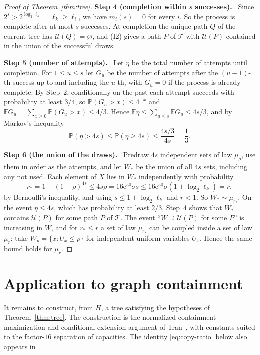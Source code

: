 \documentclass[11pt]{article}
\numberwithin{equation}{section}
\theoremstyle{remark}
\newcommand{\PP}{\mathbb P}
\newcommand{\EE}{\mathbb E}
\newcommand{\TT}{\mathcal T}
\newcommand{\UU}{\mathcal U}
\newcommand{\ee}{\mathrm e}
\newcommand{\step}[1]{\par\medskip\noindent\textbf{#1}\ }
\begin{document}
\begin{proof}[Proof of Theorem~\ref{thm:tree}]
\step{Step 4 (completion within $s$ successes).} Since
$2^s>2^{\log_2\ell_k}=\ell_k\ge\ell_i$, we have $m_i(s)=0$ for every
$i$. So the process is complete after at most $s$ successes. At
completion the unique path $Q$ of the current tree has
$\UU(Q)=\varnothing$, and (I2) gives a path $P$ of $\TT$ with $\UU(P)$
contained in the union of the successful draws.

\step{Step 5 (number of attempts).} Let $\eta$ be the total number of
attempts until completion. For $1\le u\le s$ let $G_u$ be the number of
attempts after the $(u-1)$-th success up to and including the $u$-th,
with $G_u=0$ if the process is already complete. By Step~2,
conditionally on the past each attempt succeeds with probability at
least $3/4$, so $\PP(G_u>x)\le4^{-x}$ and
$\EE G_u=\sum_{x\ge0}\PP(G_u>x)\le4/3$. Hence
$\EE\eta\le\sum_{u\le s}\EE G_u\le4s/3$, and by Markov's inequality
\[
 \PP(\eta>4s)\le\PP(\eta\ge4s)\le\frac{4s/3}{4s}=\frac13 .
\]

\step{Step 6 (the union of the draws).} Predraw $4s$ independent sets
of law $\mu_\rho$, use them in order as the attempts, and let $W_*$ be
the union of all $4s$ sets, including any not used. Each element of $X$
lies in $W_*$ independently with probability
\[
 r_*=1-(1-\rho)^{4s}
 \le4s\rho
 =16\ee^{50}\sigma s
 \le16\ee^{50}\sigma(1+\log_2\ell_k)=r,
\]
by Bernoulli's inequality, and using
$s\le1+\log_2\ell_k$ and $r<1$. So $W_*\sim\mu_{r_*}$. On the event
$\eta\le4s$, which has probability at least $2/3$, Step~4 shows that
$W_*$ contains $\UU(P)$ for some path $P$ of $\TT$. The event
``$W\supseteq\UU(P)$ for some $P$'' is increasing in $W$, and for
$r_*\le r$ a set of law $\mu_{r_*}$ can be coupled inside a set of law
$\mu_r$: take $W_p=\{x:U_x\le p\}$ for independent uniform variables
$U_x$. Hence the same bound holds for $\mu_r$.
\end{proof}

\section{Application to graph containment}\label{sec:graphs}

It remains to construct, from $H$, a tree satisfying the hypotheses of
Theorem~\ref{thm:tree}. The construction is the normalized-containment
maximization and conditional-extension argument of
Tran~\cite[Section~3, Lemma~3.1]{Tran26}, with constants suited to the
factor-$16$ separation of capacities. The identity
\eqref{eq:copy-ratio} below also appears
in~\cite[Equation~(5)]{MNSZ22}.
\end{document}

